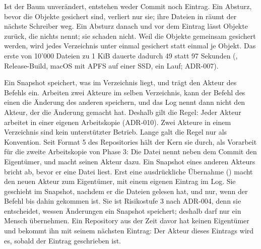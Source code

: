 Ist der Baum unverändert, entstehen weder Commit noch Eintrag.
Ein Absturz, bevor die Objekte gesichert sind, verliert nur sie;
ihre Dateien in  räumt der nächste Schreiber weg.
Ein Absturz danach und vor dem Eintrag lässt Objekte zurück, die nichts nennt;
sie schaden nicht.
Weil die Objekte gemeinsam gesichert werden,
wird jedes Verzeichnis unter  einmal gesichert statt einmal je Objekt.
Das erste  von 10'000 Dateien zu 1 KiB dauerte dadurch 49 statt 97 Sekunden
(, Release-Build, macOS mit APFS auf einer SSD, ein Lauf;
ADR-007).

Ein Snapshot speichert, was im Verzeichnis liegt, und trägt den Akteur des Befehls ein.
Arbeiten zwei Akteure im selben Verzeichnis,
kann der Befehl des einen die Änderung des anderen speichern,
und das Log nennt dann nicht den Akteur, der die Änderung gemacht hat.
Deshalb gilt die Regel: Jeder Akteur arbeitet in einer eigenen Arbeitskopie (ADR-010).
Zwei Akteure in einem Verzeichnis sind kein unterstützter Betrieb.
Lange galt die Regel nur als Konvention.
Seit Format 5 des Repositories hält der Kern sie durch, als Vorarbeit für die zweite
Arbeitskopie von Phase 3: Die Datei  nennt neben dem Commit den Eigentümer,
und  macht seinen Akteur dazu.
Ein Snapshot eines anderen Akteurs bricht ab, bevor er eine Datei liest.
Erst eine ausdrückliche Übernahme () macht den neuen Akteur zum Eigentümer,
mit einem eigenen Eintrag im Log.
Sie geschieht im Snapshot, nachdem er die Dateien gelesen hat, und nur, wenn der Befehl bis
dahin gekommen ist.
Sie ist Risikostufe 3 nach ADR-004, denn sie entscheidet, wessen Änderungen ein Snapshot speichert;
deshalb darf nur ein Mensch übernehmen.
Ein Repository aus der Zeit davor hat keinen Eigentümer und bekommt ihn mit seinem nächsten
Eintrag: Der Akteur dieses Eintrags wird es, sobald der Eintrag geschrieben ist.

